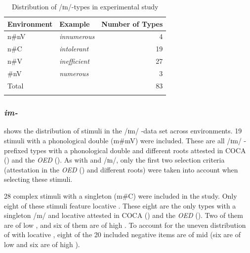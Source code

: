 \begin{table}
	\caption{Distribution of /ɪn/-types in experimental study}
	\label{tbl:distribution of in  types in experiment}

	
		\begin{tabular} {llr}
\lsptoprule
			Environment & Example & Number of  Types\\

			\midrule
			n\#nV&\textit{innumerous} & 4 \\ 

			n\#C&\textit{intolerant} & 19 \\ 
						n\#V&\textit{inefficient} & 27 \\ 
			\#nV&\textit{numerous} & 3\\ 
			\midrule   
			Total&  & 83 \\ 
			\lspbottomrule                                                                                
		\end{tabular}
	
\end{table}


\subsubsection{\textit{im-}}

 shows the distribution of  stimuli in the /ɪm/ -data set across environments. 19 stimuli with a phonological double ({m\#mV}) were included. These are all /ɪm/ -prefixed types with a phonological double and different roots attested in  {COCA} (\citealt{Davies.20082014}) and the \textit{OED} (\citealt{OED.2013}). As with  and /ɪn/, only the first two selection criteria (attestation in the \textit{OED} (\citealt{OED.2013}) and different roots) were taken into account when selecting these stimuli.


28 complex stimuli with a singleton ({m\#C}) were included in the study. Only eight of these stimuli feature locative . These eight are the only types with a singleton /m/ and locative  attested in  {COCA} (\citealt{Davies.20082014}) and the \textit{OED} (\citealt{OED.2013}). Two of them are of low , and six of them are of high .
 To account for the uneven distribution of  with locative , eight of the 20 included negative items are of mid  (six are of low and six are of high ).


